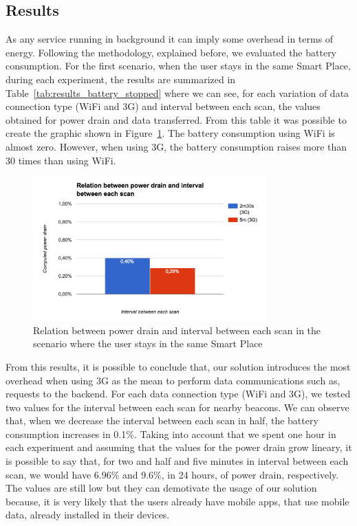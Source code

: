 \subsection{Results}
\label{sub:evaluation_energy_consumption_results}
As any service running in background it can imply some overhead in terms of energy.
Following the methodology, explained before, we evaluated the battery consumption.
For the first scenario, when the user stays in the same Smart Place, during each experiment, the results are summarized in Table~\ref{tab:results_battery_stopped} where we can see, for each variation of data connection type (\gls{WiFi} and \gls{3G}) and interval between each scan, the values obtained for power drain and data transferred.
From this table it was possible to create the graphic shown in Figure~\ref{fig:results_battery_stopped}.
The battery consumption using \gls{WiFi} is almost zero.
However, when using \gls{3G}, the battery consumption raises more than 30 times than using \gls{WiFi}.



\begin{figure}[!ht]
  \centering
    \includegraphics[width=0.8\textwidth, keepaspectratio]{images/results_battery_stopped}
    \caption[Power drain when the user does not move]{Relation between power drain and interval between each scan in the scenario where the user stays in the same Smart Place}
    \label{fig:results_battery_stopped}
\end{figure}

From this results, it is possible to conclude that, our solution introduces the most overhead when using \gls{3G} as the mean to perform data communications such as, requests to the backend.
For each data connection type (\gls{WiFi} and \gls{3G}), we tested two values for the interval between each scan for nearby beacons.
We can observe that, when we decrease the interval between each scan in half, the battery consumption increases in 0.1\%.
Taking into account that we spent one hour in each experiment and assuming that the values for the power drain grow lineary, it is possible to say that, for two and half and five minutes in interval between each scan, we would have 6.96\% and 9.6\%, in 24 hours, of power drain, respectively.
The values are still low but they can demotivate the usage of our solution because, it is very likely that the users already have mobile apps, that use mobile data, already installed in their devices.

